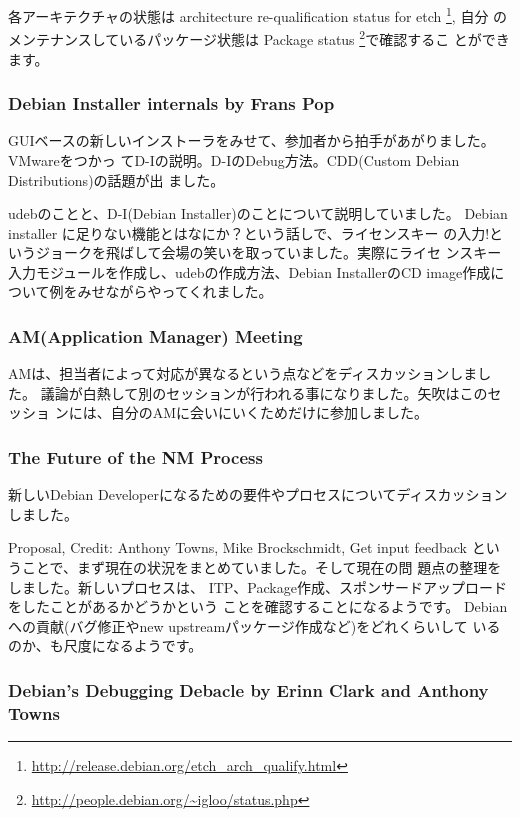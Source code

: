 \documentclass[mingoth,a4paper]{jsarticle}
\begin{document}
各アーキテクチャの状態は architecture re-qualification status for etch
\footnote{\url{http://release.debian.org/etch_arch_qualify.html}}, 自分
のメンテナンスしているパッケージ状態は Package status
\footnote{\url{http://people.debian.org/~igloo/status.php}}で確認するこ
とができます。

\subsubsection{Debian Installer internals by Frans Pop }

GUIベースの新しいインストーラをみせて、参加者から拍手があがりました。VMwareをつかっ
てD-Iの説明。D-IのDebug方法。CDD(Custom Debian Distributions)の話題が出
ました。

udebのことと、D-I(Debian Installer)のことについて説明していました。
Debian installer に足りない機能とはなにか？という話しで、ライセンスキー
の入力!というジョークを飛ばして会場の笑いを取っていました。実際にライセ
ンスキー入力モジュールを作成し、udebの作成方法、Debian InstallerのCD
image作成について例をみせながらやってくれました。

\subsubsection{AM(Application Manager) Meeting}

AMは、担当者によって対応が異なるという点などをディスカッションしました。
議論が白熱して別のセッションが行われる事になりました。矢吹はこのセッショ
ンには、自分のAMに会いにいくためだけに参加しました。

\subsubsection{The Future of the NM Process}

新しいDebian Developerになるための要件やプロセスについてディスカッション
しました。

Proposal, Credit: Anthony Towns, Mike Brockschmidt, Get input
feedback ということで、まず現在の状況をまとめていました。そして現在の問
題点の整理をしました。新しいプロセスは、
ITP、Package作成、スポンサードアップロードをしたことがあるかどうかという
ことを確認することになるようです。
Debianへの貢献(バグ修正やnew upstreamパッケージ作成など)をどれくらいして
いるのか、も尺度になるようです。

\subsubsection{Debian's Debugging Debacle by Erinn Clark and Anthony Towns }
\end{document}
